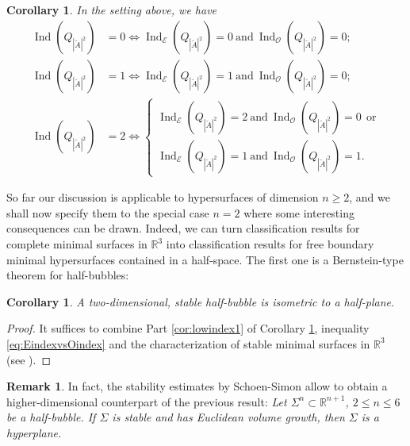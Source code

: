 \documentclass[JEP,XML,SOM,Unicode]{cedram}
\let\mathcal\mathscr
\newcounter{cas}
\DeclareMathOperator{\Ind}{Ind}
\newtheorem{cor}[thm]{Corollary}
\theoremstyle{definition}
\newtheorem{rmk}[thm]{Remark}
\newcommand{\R}{\mathbb{R}}
\begin{document}
\begin{cor}\label{cor:lowindex}
In the setting above, we have
\begin{align*}
\tag{1}\label{cor:lowindex1}\Ind(Q_{|\check{A}|^2})&=0 \iff\Ind_{\mathcal{E}}(Q_{|\check{A}|^2})=0 \ \text{and} \ \Ind_{\mathcal{O}}(Q_{|\check{A}|^2})=0; \\
\tag{2}\label{cor:lowindex2}\Ind(Q_{|\check{A}|^2})&=1 \iff\Ind_{\mathcal{E}}(Q_{|\check{A}|^2})=1 \ \text{and} \ \Ind_{\mathcal{O}}(Q_{|\check{A}|^2})=0;\\
\tag{3}\label{cor:lowindex3}\Ind(Q_{|\check{A}|^2})&=2 \iff
\begin{cases}\Ind_{\mathcal{E}}(Q_{|\check{A}|^2})=2 \ \text{and} \ \Ind_{\mathcal{O}}(Q_{|\check{A}|^2})=0 \ \ \text{or} \\
\Ind_{\mathcal{E}}(Q_{|\check{A}|^2})=1 \ \text{and} \ \Ind_{\mathcal{O}}(Q_{|\check{A}|^2})=1.
\end{cases}
\end{align*}
\end{cor}

So far our discussion is applicable to hypersurfaces of dimension $n\geq 2$, and we shall now specify them to the special case $n=2$ where some interesting consequences can be drawn.
Indeed, we can turn classification results for complete minimal surfaces in $\R^{3}$ into classification results for free boundary minimal hypersurfaces contained in a half-space. The first one is a Bernstein-type theorem for half-bubbles:

\begin{cor}\label{cor:stable}
A two-dimensional, stable half-bubble is isometric to a half-plane.
\end{cor}

\begin{proof}
It suffices to combine Part \eqref{cor:lowindex1} of Corollary \ref{cor:lowindex}, inequality \eqref{eq:EindexvsOindex} and the characterization of stable minimal surfaces in $\R^{3}$ (see \cite{dCP79,FCS80,Pog81}).
\end{proof}

\begin{rmk}\label{rmk:higher-stable}
In fact, the stability estimates by Schoen-Simon allow to obtain a higher-dimensional counterpart of the previous result: \emph{Let $\Sigma^n\subset\R^{n+1}$, $2\leq n\leq 6$ be a half-bubble. If $\Sigma$ is stable and has Euclidean volume growth, then $\Sigma$ is a hyperplane.}
\end{rmk}
\end{document}
